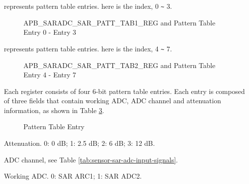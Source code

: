 \documentclass[main\_\_EN.tex]{subfiles}
\begin{document}
%
%
%
%
%
\begin{regdesc}\begin{reglist}
\item [cmd \regindex{x}] represents pattern table entries.  here is the index, 0 \verb+~+ 3.
\end{reglist}\end{regdesc}
\vspace{-2em}
\begin{figure}[H]
    \centering
    \caption{APB\_SARADC\_SAR\_PATT\_TAB1\_REG and Pattern Table Entry 0 - Entry 3}
    \label{fig:sensor-apb-saradc-sar-patt-tab1-reg-pattern-tab-entry0-entry3}
\end{figure}

%
%
%
%
%
\begin{regdesc}\begin{reglist}
\item [cmd \regindex{x}] represents pattern table entries.  here is the index, 4 \verb+~+ 7.
\end{reglist}\end{regdesc}
\vspace{-2em}
\begin{figure}[H]
    \centering
    \caption{APB\_SARADC\_SAR\_PATT\_TAB2\_REG and Pattern Table Entry 4 - Entry 7}
    \label{fig:sensor-apb-saradc-sar-patt-tab2-reg-pattern-tab-entry4-entry7}
\end{figure}

Each register consists of four 6-bit pattern table entries. Each entry is composed of three fields that contain working ADC, ADC channel and attenuation information, as shown in Table  \ref{fig:sensor-pattern-table-entry}.


\begin{figure}[H]
\centering
{}%
%
%
\end{figure}
\vspace{-2em}
\begin{figure}[H]
    \centering
    \caption{Pattern Table Entry}
    \label{fig:sensor-pattern-table-entry}
\end{figure}
\vspace{-2em}
\begin{regdesc}\begin{reglist}
\item [atten] Attenuation. 0: 0 dB; 1: 2.5 dB; 2: 6 dB; 3: 12 dB.
\item [ch\_sel] ADC channel, see Table \ref{tab:sensor-sar-adc-input-signals}.
\item [sar\_sel] Working ADC. 0: SAR ARC1; 1: SAR ADC2.
\end{reglist}\end{regdesc}
\end{document}

